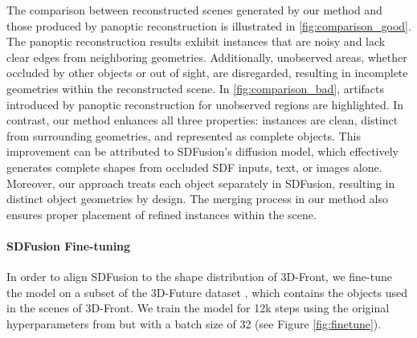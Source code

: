 The comparison between reconstructed scenes generated by our method and those produced by panoptic reconstruction is illustrated in \ref{fig:comparison_good}.
The panoptic reconstruction results exhibit instances that are noisy and lack clear edges from neighboring geometries.
Additionally, unobserved areas, whether occluded by other objects or out of sight, are disregarded, resulting in incomplete geometries within the reconstructed scene.
In \ref{fig:comparison_bad}, artifacts introduced by panoptic reconstruction for unobserved regions are highlighted.
In contrast, our method enhances all three properties: instances are clean, distinct from surrounding geometries, and represented as complete objects.
This improvement can be attributed to SDFusion's diffusion model, which effectively generates complete shapes from occluded SDF inputs, text, or images alone.
Moreover, our approach treats each object separately in SDFusion, resulting in distinct object geometries by design. The merging process in our method also ensures proper placement of refined instances within the scene.


\paragraph{SDFusion Fine-tuning}
In order to align SDFusion to the shape distribution of 3D-Front, we fine-tune the model on a subset of the 3D-Future dataset \citep{fu20213e}, which contains the objects used in the scenes of 3D-Front.
We train the model for 12k steps using the original hyperparameters from \citet{cheng2023sdfusion} but with a batch size of 32 (see Figure \ref{fig:finetune}).

